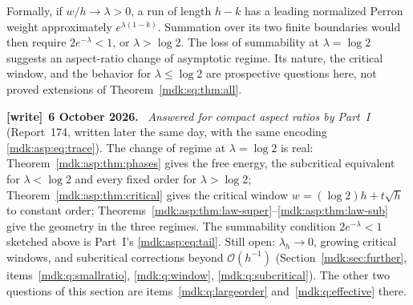 \documentclass[11pt,letterpaper]{article}
\numberwithin{equation}{section}
\theoremstyle{remark}\newtheorem{remark}[theorem]{Remark}
\newcommand{\Oh}{\mathcal O}\newcommand{\Q}{\mathbb Q}\newcommand{\N}{\mathbb N}\newcommand{\R}{\mathbb R}
\newenvironment{writenote}[1][]{\par\smallskip\begingroup\small
 \noindent\textbf{[write]}\if\relax\detokenize{#1}\relax\else~\textbf{#1.}\fi\ }%
 {\par\endgroup\smallskip}
\begin{document}
Formally, if $w/h\to\lambda>0$, a run of length $h-k$ has a leading normalized Perron weight approximately $e^{\lambda(1-k)}$. Summation over its two finite boundaries would then require $2e^{-\lambda}<1$, or $\lambda>\log2$. The loss of summability at $\lambda=\log2$ suggests an aspect-ratio change of asymptotic regime. Its nature, the critical window, and the behavior for $\lambda\le\log2$ are prospective questions here, not proved extensions of Theorem~\ref{mdk:sq:thm:all}.
\begin{writenote}[6 October 2026]
\emph{Answered for compact aspect ratios by Part~I} (Report~174, written later the same day, with the same encoding \eqref{mdk:asp:eq:trace}). The change of regime at $\lambda=\log2$ is real: Theorem~\ref{mdk:asp:thm:phases} gives the free energy, the subcritical equivalent for $\lambda<\log2$ and every fixed order for $\lambda>\log2$; Theorem~\ref{mdk:asp:thm:critical} gives the critical window $w=(\log2)h+t\sqrt h$ to constant order; Theorems~\ref{mdk:asp:thm:law-super}--\ref{mdk:asp:thm:law-sub} give the geometry in the three regimes. The summability condition $2e^{-\lambda}<1$ sketched above is Part~I's \eqref{mdk:asp:eq:tail}. Still open: $\lambda_h\to0$, growing critical windows, and subcritical corrections beyond $\Oh(h^{-1})$ (Section~\ref{mdk:sec:further}, items~\ref{mdk:q:smallratio}, \ref{mdk:q:window}, \ref{mdk:q:subcritical}). The other two questions of this section are items~\ref{mdk:q:largeorder} and~\ref{mdk:q:effective} there.
\end{writenote}
\clearpage
{}
\setcounter{equation}{0}%
\makeatletter\renewcommand{\theHequation}{pl.\arabic{equation}}\makeatother
\end{document}

